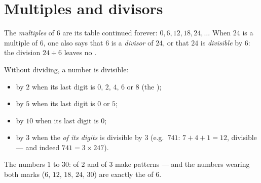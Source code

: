 \section{Multiples and divisors}

\begin{definition}\label{def:g5:division:multiple}
The \emph{multiples} of $6$ are its table continued
forever: $0, 6, 12, 18, 24, \dots$ When $24$ is a multiple of $6$,
one also says that $6$ is a \emph{divisor} of $24$,
or that $24$ is \emph{divisible} by $6$: the division
$24 \div 6$ leaves no .
\end{definition}

\begin{proposition}\label{prop:g5:division:criteria}
Without dividing, a number is divisible:
\begin{itemize}
  \item by $2$ when its last digit is $0$, $2$, $4$, $6$ or $8$
        (the );
  \item by $5$ when its last digit is $0$ or $5$;
  \item by $10$ when its last digit is $0$;
  \item by $3$ when the \emph{ of its digits} is divisible by
        $3$ (e.g.\ $741$: $7 + 4 + 1 = 12$, divisible --- and indeed
        $741 = 3 \times 247$).
\end{itemize}
\end{proposition}
\admitted

\begin{omfigure}

{\small The numbers $1$ to $30$:  of $2$ and of $3$ make
patterns --- and the numbers wearing both marks ($6$, $12$, $18$,
$24$, $30$) are exactly the  of $6$.}
\end{omfigure}

